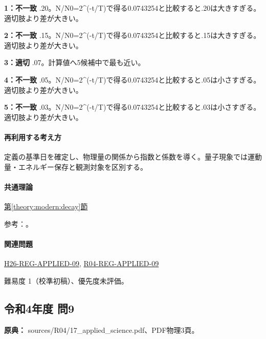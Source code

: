 \noindent\textbf{1：不一致} .20。N/N0=\allowbreak{}2\textasciicircum{}(-t/T)で得る0.0743254と比較すると.20は大きすぎる。 適切肢より差が大きい。\par

\noindent\textbf{2：不一致} .15。N/N0=\allowbreak{}2\textasciicircum{}(-t/T)で得る0.0743254と比較すると.15は大きすぎる。 適切肢より差が大きい。\par

\noindent\textbf{3：適切} .07。計算値へ5候補中で最も近い。\par

\noindent\textbf{4：不一致} .05。N/N0=\allowbreak{}2\textasciicircum{}(-t/T)で得る0.0743254と比較すると.05は小さすぎる。 適切肢より差が大きい。\par

\noindent\textbf{5：不一致} .03。N/N0=\allowbreak{}2\textasciicircum{}(-t/T)で得る0.0743254と比較すると.03は小さすぎる。 適切肢より差が大きい。\par

\paragraph{再利用する考え方} 定義の基準日を確定し、物理量の関係から指数と係数を導く。量子現象では運動量・エネルギー保存と観測対象を区別する。

\paragraph{共通理論} \hyperref[theory:modern:decay]{第\ref*{theory:modern:decay}節}

\par 参考：\cite{modern_mit_nuclear}。

\paragraph{関連問題} \hyperref[q:h26-reg-applied-09]{H26-REG-APPLIED-09}, \hyperref[q:r04-reg-applied-09]{R04-REG-APPLIED-09}

\par 難易度 1（校準初稿）、優先度未評価。

\subsection{令和4年度 問9}
\label{q:r04-reg-applied-09}

\noindent\textbf{原典：} sources/R04/17\_applied\_science.pdf、PDF物理3頁。

